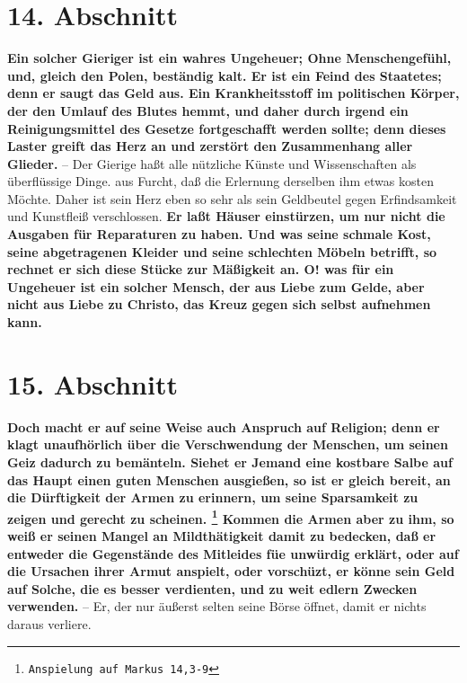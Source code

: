 \section{14. Abschnitt} \label{kap13_ab14}

\label{ref:13_14_reichtum_schaden}
\textbf{Ein solcher Gieriger ist ein wahres Ungeheuer;
Ohne Menschengefühl, und, gleich
den Polen, beständig kalt. Er ist ein Feind des Staatetes; denn er saugt das
Geld aus. Ein Krankheitsstoff im politischen Körper, der den Umlauf des Blutes
hemmt, und daher durch irgend ein Reinigungsmittel des
Gesetze fortgeschafft
werden sollte; denn dieses Laster greift das Herz an und zerstört den
Zusammenhang aller Glieder.} -- Der Gierige haßt alle nützliche
Künste und
Wissenschaften als überflüssige Dinge. aus
Furcht, daß die Erlernung derselben
ihm etwas kosten Möchte. Daher ist sein Herz eben so
sehr als sein Geldbeutel
gegen Erfindsamkeit und Kunstfleiß verschlossen. \label{ref:13_14_reichtum_einsturz}
\textbf{Er laßt Häuser einstürzen, um
nur nicht die Ausgaben für Reparaturen zu haben. Und was seine schmale Kost,
seine abgetragenen Kleider und seine schlechten Möbeln betrifft, so rechnet er
sich diese Stücke zur Mäßigkeit an. O! was für ein Ungeheuer ist ein solcher
Mensch, der aus Liebe zum Gelde, aber nicht aus Liebe zu Christo, das
Kreuz
gegen sich selbst aufnehmen kann.}

\section{15. Abschnitt} \label{kap13_ab15}

\label{ref:13_15_Kapitalisten_kritik}
\textbf{Doch macht er auf seine Weise auch Anspruch auf Religion; denn er klagt
unaufhörlich über die Verschwendung der Menschen, um seinen
Geiz dadurch zu
bemänteln. Siehet er Jemand eine kostbare Salbe auf das Haupt einen guten
Menschen ausgießen, so ist er gleich bereit, an die Dürftigkeit der Armen zu
erinnern, um seine Sparsamkeit zu zeigen und gerecht zu scheinen.
\footnote{\texttt{Anspielung auf Markus 14,3-9}}
Kommen die
Armen aber zu ihm, so weiß er seinen Mangel an
Mildthätigkeit damit zu bedecken,
daß er entweder die Gegenstände des Mitleides füe unwürdig erklärt, oder auf die
Ursachen ihrer Armut anspielt, oder vorschüzt, er könne
sein Geld auf Solche,
die es besser verdienten, und zu weit edlern Zwecken verwenden.} -- Er, der nur
äußerst selten seine Börse öffnet, damit er nichts daraus verliere.

